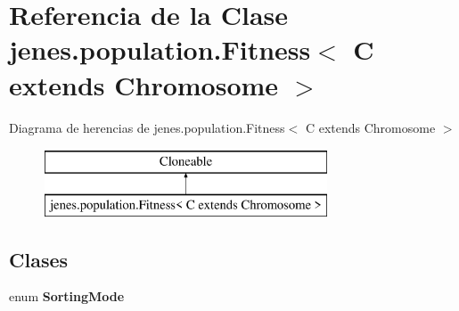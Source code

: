 \hypertarget{classjenes_1_1population_1_1_fitness_3_01_c_01extends_01_chromosome_01_4}{\section{Referencia de la Clase jenes.\-population.\-Fitness$<$ C extends Chromosome $>$}
\label{classjenes_1_1population_1_1_fitness_3_01_c_01extends_01_chromosome_01_4}
}
Diagrama de herencias de jenes.\-population.\-Fitness$<$ C extends Chromosome $>$\begin{figure}[H]
\begin{center}
\leavevmode
\includegraphics[height=2.000000cm]{classjenes_1_1population_1_1_fitness_3_01_c_01extends_01_chromosome_01_4}
\end{center}
\end{figure}
\subsection*{Clases}
\begin{DoxyCompactItemize}
\item 
enum {\bfseries Sorting\-Mode}
\end{DoxyCompactItemize}

